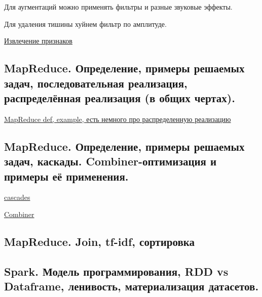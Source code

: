 \documentclass{article}
\begin{document}
Для аугментаций можно применять фильтры и разные звуковые эффекты.

Для удаления тишины хуйнем фильтр по амплитуде.

\href{
	https://zen.yandex.ru/media/nuancesprog/analiz-audiodannyh-s-pomosciu-glubokogo-obucheniia-i-python-chast-1-5f05940552908058fabd38a3
}{Извлечение признаков}


\subsection{MapReduce. Определение, примеры решаемых задач, последовательная
реализация, распределённая реализация (в общих чертах).}

\href{
	https://ru.wikipedia.org/wiki/MapReduce#:~:text=MapReduce%
}{MapReduce def, example, есть немного про распределенную реализацию}


\subsection{MapReduce. Определение, примеры решаемых задач, каскады.
Combiner-оптимизация и примеры её применения.}

\href{
	https://blog.matthewrathbone.com/2015/06/25/real-world-hadoop-implementing-a-left-outer-join-in-java-with-cascading.html
}{cascades}

\href{
	https://coderlessons.com/tutorials/bolshie-dannye-i-analitika/izuchit-kartu-umenshit/mapreduce-combiners
}{Combiner}


\subsection{MapReduce. Join, tf-idf, сортировка}


\subsection{Spark. Модель программирования, RDD vs Dataframe, ленивость,
материализация датасетов.}
\end{document}
